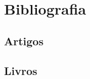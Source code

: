 \nocite{flemming2007,hoffmann2008,tan2008,jacques2010,bonafini2011,murolo2011,oliveira2016,barbosa2017,castanheira2017,panonceli2017,souza2018,munaretto2018,boldrini1986,steinbruch2009,franco2016,fernandes2017,domingues2018}

\chapter*{Bibliografia}


\section*{Artigos}
\printbibliography[heading=bibempty,type=article]


\section*{Livros}
\printbibliography[heading=bibempty,type=book]
